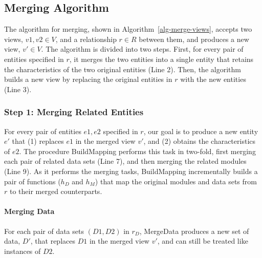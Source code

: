 \subsection{Merging Algorithm}

The algorithm for merging, shown in Algorithm~\ref{alg-merge-views},
accepts two views, $v1, v2 \in V$, and a relationship $r \in R$
between them, and produces a new view, $v' \in V$. The algorithm is
divided into two steps. First, for every pair of entities specified in
$r$, it merges the two entities into a single entity that retains the
characteristics of the two original entities (Line 2). Then, the
algorithm builds a new view by replacing the original entities in
$r$ with the new entities (Line 3).


\subsubsection{Step 1: Merging Related Entities}

For every pair of entities $e1, e2$ specified in $r$, our goal is to
produce a new entity $e'$ that (1) replaces $e1$ in the merged view
$v'$, and (2) obtains the characteristics of $e2$. The procedure
\textsf{BuildMapping} performs this task in two-fold, first merging
each pair of related data sets (Line 7), and then merging the related
modules (Line 9). As it performs the merging tasks,
\textsf{BuildMapping} incrementally builds a pair of functions
($h_{D}$ and $h_{M}$) that map the original modules and data sets from
$r$ to their merged counterparts.


\paragraph{\textbf{Merging Data}} For each pair of data sets $(D1,
D2)$ in $r_{D}$, \textsf{MergeData} produces a new set of data, $D'$,
that replaces $D1$ in the merged view $v'$, and can still be treated
like instances of $D2$. 

